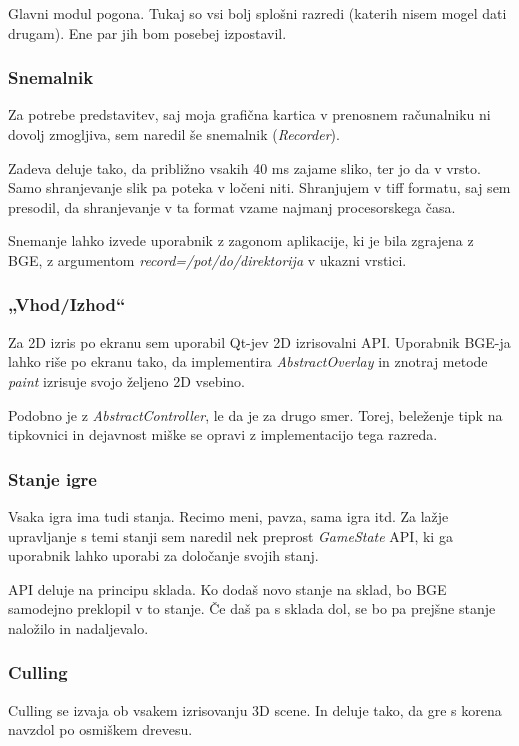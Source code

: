 \documentclass[a4paper]{article}
\begin{document}
Glavni modul pogona. Tukaj so vsi bolj splošni razredi (katerih nisem mogel dati drugam). Ene par jih bom posebej izpostavil.

\subsubsection{Snemalnik}
Za potrebe predstavitev, saj moja grafična kartica v prenosnem računalniku ni dovolj zmogljiva, sem naredil še snemalnik (\emph{Recorder}).

Zadeva deluje tako, da približno vsakih 40 ms zajame sliko, ter jo da v vrsto. Samo shranjevanje slik pa poteka v ločeni niti. Shranjujem v tiff formatu, saj sem presodil, da shranjevanje v ta format vzame najmanj procesorskega časa.

Snemanje lahko izvede uporabnik z zagonom aplikacije, ki je bila zgrajena z BGE, z argumentom \emph{record=/pot/do/direktorija} v ukazni vrstici.

\subsubsection{„Vhod/Izhod“}
Za 2D izris po ekranu sem uporabil Qt-jev 2D izrisovalni API. Uporabnik BGE-ja lahko riše po ekranu tako, da implementira \emph{AbstractOverlay} in znotraj metode \emph{paint} izrisuje svojo željeno 2D vsebino.

Podobno je z \emph{AbstractController}, le da je za drugo smer. Torej, beleženje tipk na tipkovnici in dejavnost miške se opravi z implementacijo tega razreda.

\subsubsection{Stanje igre}
Vsaka igra ima tudi stanja. Recimo meni, pavza, sama igra itd. Za lažje upravljanje s temi stanji sem naredil nek preprost \emph{GameState} API, ki ga uporabnik lahko uporabi za določanje svojih stanj.

API deluje na principu sklada. Ko dodaš novo stanje na sklad, bo BGE samodejno preklopil v to stanje. Če daš pa s sklada dol, se bo pa prejšne stanje naložilo in nadaljevalo.

\subsubsection{Culling}
Culling se izvaja ob vsakem izrisovanju 3D scene. In deluje tako, da gre s korena navzdol po osmiškem drevesu.
\end{document}

